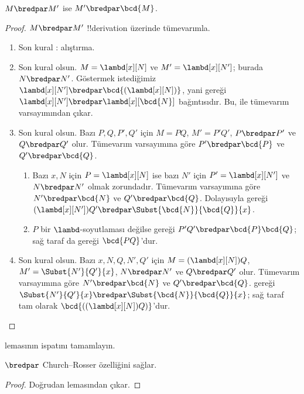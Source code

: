 \documentclass[../../../include/open-logic-section]{subfiles}
\begin{document}
\begin{lem}
  $M \bredpar M'$ ise $M' \bredpar \bcd{M}$.
\end{lem}
\begin{proof}
  $M \bredpar M'$ !!{derivation} üzerinde tümevarımla.
  \begin{enumerate}
    \item Son kural : alıştırma.
    \item Son kural  olsun. $M=\lambd[x][N]$ ve
      $M'=\lambd[x][N']$; burada $N\bredpar N'$. Göstermek istediğimiz
      $\lambd[x][N']\bredpar\bcd{(\lambd[x][N])}$, yani
       gereği
      $\lambd[x][N']\bredpar\lambd[x][\bcd{N}]$ bağıntısıdır. Bu,
       ile tümevarım varsayımından çıkar.
    \item Son kural  olsun. Bazı $P,Q,P',Q'$ için
      $M=PQ$, $M'=P'Q'$, $P\bredpar P'$ ve $Q\bredpar Q'$ olur. Tümevarım
      varsayımına göre $P'\bredpar\bcd{P}$ ve $Q'\bredpar\bcd{Q}$.
      \begin{enumerate}
        \item Bazı $x,N$ için $P=\lambd[x][N]$ ise bazı $N'$ için
          $P'=\lambd[x][N']$ ve $N\bredpar N'$ olmak zorundadır. Tümevarım
          varsayımına göre $N'\bredpar\bcd{N}$ ve $Q'\bredpar\bcd{Q}$.
          Dolayısıyla  gereği
          $(\lambd[x][N'])Q'\bredpar\Subst{\bcd{N}}{\bcd{Q}}{x}$.
        \item $P$ bir $\lambd$-soyutlaması değilse
           gereği $P'Q'\bredpar\bcd{P}\bcd{Q}$;
          sağ taraf da  gereği $\bcd{PQ}$'dur.
      \end{enumerate}
    \item Son kural  olsun. Bazı $x,N,Q,N',Q'$ için
      $M=(\lambd[x][N])Q$, $M'=\Subst{N'}{Q'}{x}$,
      $N\bredpar N'$ ve $Q\bredpar Q'$ olur. Tümevarım varsayımına göre
      $N'\bredpar\bcd{N}$ ve $Q'\bredpar\bcd{Q}$.  gereği
      $\Subst{N'}{Q'}{x}\bredpar\Subst{\bcd{N}}{\bcd{Q}}{x}$; sağ taraf
      tam olarak $\bcd{((\lambd[x][N])Q)}$'dur.
  \end{enumerate}
\end{proof}

\begin{prob}
   lemasının ispatını tamamlayın.
\end{prob}

\begin{thm}
  $\bredpar$ Church--Rosser özelliğini sağlar.
\end{thm}

\begin{proof}
  Doğrudan  lemasından çıkar.
\end{proof}
\end{document}
